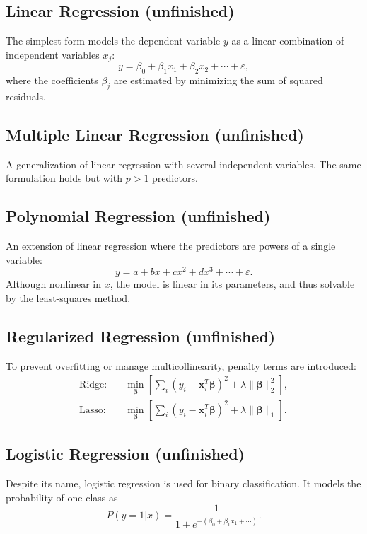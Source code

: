 \documentclass[../../../main.tex]{subfiles}
\begin{document}
\subsection{Linear Regression (unfinished)}
The simplest form models the dependent variable \( y \) as a linear combination of independent variables \( x_j \):
\begin{equation*}
    y = \beta_0 + \beta_1 x_1 + \beta_2 x_2 + \cdots + \varepsilon,
\end{equation*}
where the coefficients \( \beta_j \) are estimated by minimizing the sum of squared residuals.

\subsection{Multiple Linear Regression (unfinished)}
A generalization of linear regression with several independent variables.  
The same formulation holds but with \( p > 1 \) predictors.

\subsection{Polynomial Regression (unfinished)}
An extension of linear regression where the predictors are powers of a single variable:
\begin{equation*}
    y = a + b x + c x^2 + d x^3 + \cdots + \varepsilon.
\end{equation*}
Although nonlinear in \( x \), the model is linear in its parameters, and thus solvable by the least-squares method.

\subsection{Regularized Regression (unfinished)}
To prevent overfitting or manage multicollinearity, penalty terms are introduced:
\begin{align}
    \text{Ridge:} &\quad \min_{\boldsymbol{\beta}} \left[ \sum_i (y_i - \mathbf{x}_i^T \boldsymbol{\beta})^2 + \lambda \|\boldsymbol{\beta}\|_2^2 \right], \\
    \text{Lasso:} &\quad \min_{\boldsymbol{\beta}} \left[ \sum_i (y_i - \mathbf{x}_i^T \boldsymbol{\beta})^2 + \lambda \|\boldsymbol{\beta}\|_1 \right].
\end{align}

\subsection{Logistic Regression (unfinished)}
Despite its name, logistic regression is used for binary classification.  
It models the probability of one class as
\begin{equation*}
    P(y=1|x) = \frac{1}{1 + e^{-(\beta_0 + \beta_1 x_1 + \cdots)}}.
\end{equation*}
\end{document}
